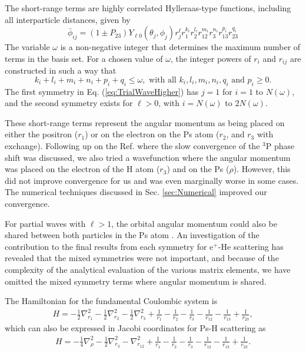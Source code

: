 \documentclass[preprint,showpacs,preprintnumbers,amsmath,amssymb,longbibliography,pra,aps]{revtex4-1}
\begin{document}
The short-range terms are highly correlated Hylleraas-type functions, including all interparticle distances, given by
\begin{equation}
\label{eq:PhiDef}
\bar{\phi}_{ij} = \left(1 \pm P_{23}\right) Y_{\ell 0}(\theta_j,\phi_j) r_j^{\ell} r_1^{k_i} r_2^{l_i} r_{12}^{m_i} r_3^{n_i} r_{13}^{p_i} r_{23}^{q_i}
\end{equation}
The variable $\omega$ is a non-negative integer that determines the maximum number of terms in the basis set. For a chosen value of $\omega$, the integer powers of $r_i$ and $r_{ij}$ are constructed in such a way that 
\begin{equation}
k_i + l_i + m_i + n_i + p_i + q_i \leq \omega, \text{ with all } k_i, l_i, m_i, n_i, q_i \text{ and } p_i \geq 0.\end{equation}
The first symmetry in Eq. (\ref{eq:TrialWaveHigher}) has $j=1$ for $i=1$ to $N(\omega)$, and the second symmetry exists for $\ell > 0$, with $i = N(\omega)$ to $2N(\omega)$.

These short-range terms represent the angular momentum as being placed on either the positron ($r_1$) or on the electron on the Ps atom ($r_2$, and $r_3$ with exchange). Following up on the Ref. \cite{VanReeth2004} where the slow convergence of the $^3$P phase shift was discussed, we also tried a wavefunction where the angular momentum was placed on the electron of the H atom ($r_3$) and on the Ps ($\rho$). However, this did not improve convergence for us and was even marginally worse in some cases. The numerical techniques discussed in Sec. \ref{sec:Numerical} improved our convergence.

For partial waves with $\ell>1$, the orbital angular momentum could also be shared between both particles in the Ps atom \cite{Schwartz1961a}. An investigation of the contribution to the final results from each symmetry for e$^+$-He scattering \cite{VanReeth1997} has revealed that the mixed symmetries were not important, and because of the complexity of the analytical evaluation of the various matrix elements, we have omitted the mixed symmetry terms where angular momentum is shared.

The Hamiltonian for the fundamental Coulombic system is
\begin{align}
H = -\frac{1}{2} \nabla_{r_1}^2 - \frac{1}{2} \nabla_{r_2}^2 - \frac{1}{2} \nabla_{r_3}^2 + \frac {1}{r_1}-\frac {1}{r_2}-\frac {1}{r_3}-\frac {1}{r_{12}}-\frac {1}{r_{13}}+\frac {1}{r_{23}},
\label{eq:Hamiltonian1}
\end{align}
which can also be expressed in Jacobi coordinates for Ps-H scattering as
\begin{align}
H = -\frac{1}{4} \nabla_{\rho}^2 - \frac{1}{2} \nabla_{r_3}^2 - \nabla_{r_{12}}^2 + \frac {1}{r_1}-\frac {1}{r_2}-\frac {1}{r_3}-\frac {1}{r_{12}}-\frac {1}{r_{13}}+\frac {1}{r_{23}}.
\label{eq:Hamiltonian2}
\end{align}
\end{document}
